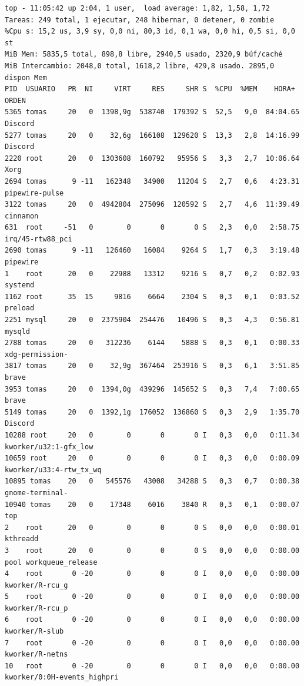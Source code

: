 \documentclass{article}
\begin{document}
\begin{commandline}
 {\footnotesize
\begin{verbatim}
top - 11:05:42 up 2:04, 1 user,  load average: 1,82, 1,58, 1,72
Tareas: 249 total, 1 ejecutar, 248 hibernar, 0 detener, 0 zombie
%Cpu s: 15,2 us, 3,9 sy, 0,0 ni, 80,3 id, 0,1 wa, 0,0 hi, 0,5 si, 0,0 st
MiB Mem: 5835,5 total, 898,8 libre, 2940,5 usado, 2320,9 búf/caché
MiB Intercambio: 2048,0 total, 1618,2 libre, 429,8 usado. 2895,0 dispon Mem
PID  USUARIO   PR  NI     VIRT     RES     SHR S  %CPU  %MEM    HORA+   ORDEN
5365 tomas     20   0  1398,9g  538740  179392 S  52,5   9,0  84:04.65  Discord
5277 tomas     20   0    32,6g  166108  129620 S  13,3   2,8  14:16.99  Discord
2220 root      20   0  1303608  160792   95956 S   3,3   2,7  10:06.64  Xorg
2694 tomas      9 -11   162348   34900   11204 S   2,7   0,6   4:23.31  pipewire-pulse
3122 tomas     20   0  4942804  275096  120592 S   2,7   4,6  11:39.49  cinnamon
631  root     -51   0        0       0       0 S   2,3   0,0   2:58.75  irq/45-rtw88_pci
2690 tomas      9 -11   126460   16084    9264 S   1,7   0,3   3:19.48  pipewire
1    root      20   0    22988   13312    9216 S   0,7   0,2   0:02.93  systemd
1162 root      35  15     9816    6664    2304 S   0,3   0,1   0:03.52  preload
2251 mysql     20   0  2375904  254476   10496 S   0,3   4,3   0:56.81  mysqld
2788 tomas     20   0   312236    6144    5888 S   0,3   0,1   0:00.33  xdg-permission-
3817 tomas     20   0    32,9g  367464  253916 S   0,3   6,1   3:51.85  brave
3953 tomas     20   0  1394,0g  439296  145652 S   0,3   7,4   7:00.65  brave
5149 tomas     20   0  1392,1g  176052  136860 S   0,3   2,9   1:35.70  Discord
10288 root     20   0        0       0       0 I   0,3   0,0   0:11.34  kworker/u32:1-gfx_low
10659 root     20   0        0       0       0 I   0,3   0,0   0:00.09  kworker/u33:4-rtw_tx_wq
10895 tomas    20   0   545576   43008   34288 S   0,3   0,7   0:00.38  gnome-terminal-
10940 tomas    20   0    17348    6016    3840 R   0,3   0,1   0:00.07  top
2    root      20   0        0       0       0 S   0,0   0,0   0:00.01  kthreadd 
3    root      20   0        0       0       0 S   0,0   0,0   0:00.00  pool workqueue_release
4    root       0 -20        0       0       0 I   0,0   0,0   0:00.00  kworker/R-rcu_g
5    root       0 -20        0       0       0 I   0,0   0,0   0:00.00  kworker/R-rcu_p
6    root       0 -20        0       0       0 I   0,0   0,0   0:00.00  kworker/R-slub
7    root       0 -20        0       0       0 I   0,0   0,0   0:00.00  kworker/R-netns
10   root       0 -20        0       0       0 I   0,0   0,0   0:00.00  kworker/0:0H-events_highpri

\end{verbatim}}
\end{commandline}
\end{document}
